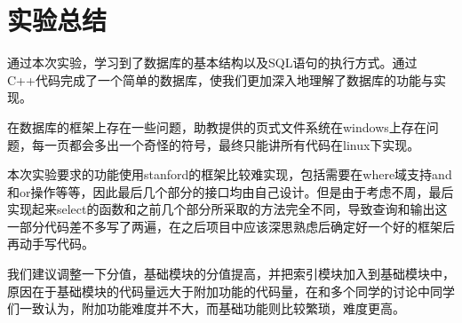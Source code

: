 
\chapter{实验总结} %

\label{Chapter6} %

通过本次实验，学习到了数据库的基本结构以及SQL语句的执行方式。通过C++代码完成了一个简单的数据库，使我们更加深入地理解了数据库的功能与实现。

在数据库的框架上存在一些问题，助教提供的页式文件系统在windows上存在问题，每一页都会多出一个奇怪的符号，最终只能讲所有代码在linux下实现。

本次实验要求的功能使用stanford的框架比较难实现，包括需要在where域支持and和or操作等等，因此最后几个部分的接口均由自己设计。但是由于考虑不周，最后实现起来select的函数和之前几个部分所采取的方法完全不同，导致查询和输出这一部分代码差不多写了两遍，在之后项目中应该深思熟虑后确定好一个好的框架后再动手写代码。

我们建议调整一下分值，基础模块的分值提高，并把索引模块加入到基础模块中，原因在于基础模块的代码量远大于附加功能的代码量，在和多个同学的讨论中同学们一致认为，附加功能难度并不大，而基础功能则比较繁琐，难度更高。